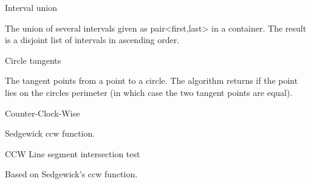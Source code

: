 \begin{algorithm}{Interval union}

\desc
The union of several intervals given as pair<first,last> in a container. The
result is a disjoint list of intervals in ascending order.
\end{algorithm}

\begin{algorithm}{Circle tangents}

\desc
The tangent points from a point to a circle. The algorithm returns if
the point lies on the circles perimeter (in which case the two tangent
points are equal).
\end{algorithm}

\begin{algorithm}{Counter-Clock-Wise}

\desc
Sedgewick ccw function.
\end{algorithm}

\begin{algorithm}{CCW Line segment intersection test}

\desc
Based on Sedgewick's ccw function.
\end{algorithm}
